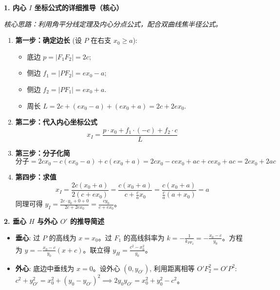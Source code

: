 \begin{proofbox}
\textbf{1. 内心 $I$ 坐标公式的详细推导（核心）}

\textit{核心思路：利用角平分线定理及内心分点公式，配合双曲线焦半径公式。}

\begin{enumerate}
    \item \textbf{第一步：确定边长} (设 $P$ 在右支 $x_0 \ge a$):
    \begin{itemize}
        \item 底边 $p = |F_1F_2| = 2c$;
        \item 侧边 $f_1 = |PF_2| = ex_0 - a$;
        \item 侧边 $f_2 = |PF_1| = ex_0 + a$.
        \item 周长 $L = 2c + (ex_0 - a) + (ex_0 + a) = 2c + 2ex_0$.
    \end{itemize}
    \item \textbf{第二步：代入内心坐标公式}
    \[ x_I = \frac{p \cdot x_0 + f_1 \cdot (-c) + f_2 \cdot c}{L} \]
    \item \textbf{第三步：分子化简}
    \[ \text{分子} = 2cx_0 - c(ex_0 - a) + c(ex_0 + a) = 2cx_0 - cex_0 + ac + cex_0 + ac = 2cx_0 + 2ac \]
    \item \textbf{第四步：求值}
    \[ x_I = \frac{2c(x_0 + a)}{2(c + ex_0)} = \frac{c(x_0 + a)}{c + \frac{c}{a}x_0} = \frac{c(x_0 + a)}{\frac{c}{a}(a + x_0)} = a \]
    同理可得 $y_I = \frac{2c \cdot y_0 + 0 + 0}{2c + 2ex_0} = \frac{cy_0}{c+ex_0}$。
\end{enumerate}

\tcbline

\textbf{2. 垂心 $H$ 与外心 $O'$ 的推导简述}

\begin{itemize}
    \item \textbf{垂心}: 过 $P$ 的高线为 $x = x_0$。过 $F_1$ 的高线斜率为 $k = -\frac{1}{k_{PF_2}} = -\frac{x_0-c}{y_0}$。方程为 $y = -\frac{x_0-c}{y_0}(x+c)$。联立得 $y_H = \frac{c^2-x_0^2}{y_0}$。
    \item \textbf{外心}: 底边中垂线为 $x=0$。设外心 $(0, y_{O'})$, 利用距离相等 $O'F_2^2 = O'P^2$:
    $c^2 + y_{O'}^2 = x_0^2 + (y_0 - y_{O'})^2 \implies 2y_0y_{O'} = x_0^2 + y_0^2 - c^2$。
\end{itemize}
\end{proofbox}